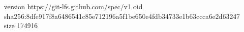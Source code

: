 version https://git-lfs.github.com/spec/v1
oid sha256:8dfe917f8a6486541c85e712196a5f1be650e4fdb34733e1b63ccca6e2d63247
size 174916
